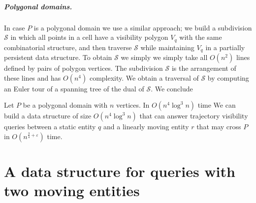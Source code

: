 \documentclass[UKenglish]{lipics-v2019}
\newcommand{\mkmcal}[1]{\ensuremath{\mathcal{#1}}\xspace}
\renewcommand{\S}{\mkmcal{S}}
\newcommand{\eps}{\ensuremath{\varepsilon}\xspace}
\begin{document}
\subparagraph{Polygonal domains.} In case $P$ is a polygonal domain we use a
similar approach; we build a subdivision \S in which all points in a cell have
a visibility polygon $V_q$ with the same combinatorial structure, and then
traverse \S while maintaining $V_q$ in a partially persistent data
structure. To obtain \S we simply we simply take all $O(n^2)$ lines defined by
pairs of polygon vertices. The subdivision \S is the arrangement of these lines
and has $O(n^4)$ complexity. We obtain a traversal of \S by computing an Euler
tour of a spanning tree of the dual of \S. We conclude

\begin{theorem}
  \label{thm:one_dead_one_ghost}
  Let $P$ be a polygonal domain with $n$ vertices. In $O(n^4\log^3 n)$ time We
  can build a data structure of size $O(n^4\log^3 n)$ that can answer
  trajectory visibility queries between a static entity $q$ and a linearly
  moving entity $r$ that may cross $P$ in $O(n^{\frac{3}{4}+\eps})$ time.
\end{theorem}

\section{A data structure for queries with two moving entities}
\label{sec:lineline}

\end{document}
